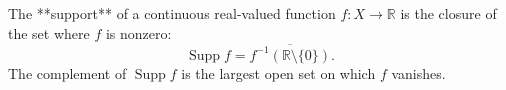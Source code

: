 The **support** of a continuous real-valued function $f: X \to \mathbb{R}$ is the closure of the set where $f$ is nonzero:
$$\operatorname{Supp} f = \overline{f^{-1}(\mathbb{R} \setminus \{0\})}.$$
The complement of $\operatorname{Supp} f$ is the largest open set on which $f$ vanishes.
